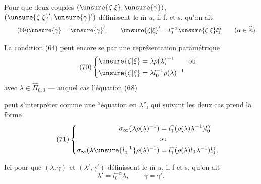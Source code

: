 Pour que deux couples $(\unsure{\zeta|\xi},\unsure{\gamma})$, $(\unsure{\zeta|\xi}',\unsure{\gamma}')$ définissent le $\overline{\mathrm m}$ $u$, il f. et s. qu'on ait
\[
\tag{69}
\unsure{\gamma}=\unsure{\gamma}',\qquad
\unsure{\zeta|\xi}'=l_0^{-\alpha}\unsure{\zeta|\xi} l_1^\alpha\qquad(\alpha\in\widehat{\mathbb Z}).
\]

La condition (64) peut encore se  par une représentation paramétrique
\[
\tag{70}
\left\{
\begin{aligned}
\unsure{\zeta|\xi}&=\lambda\rho(\lambda)^{-1}\qquad\text{ou}\\
\unsure{\zeta|\xi}&=\lambda l_0^{-1}\rho(\lambda)^{-1}
\end{aligned}
\right.
\]
avec $\lambda\in\widehat{\Pi}_{0,3}$ --- auquel cas l'équation (68)


peut s'interpréter comme une ``équation en $\lambda$'', qui suivant les deux cas prend la forme
\[
\tag{71}
\left\{
\begin{aligned}
\sigma_\infty(\lambda\rho(\lambda)^{-1})
 &=l_1^\gamma(\rho(\lambda)\lambda^{-1})l_0^\gamma\\
&\text{ou}\\
\sigma_\infty(\lambda\unsure{l_0^{-1}}\rho(\lambda)^{-1})
 &=l_1^\gamma(\rho(\lambda)l_0\lambda^{-1})l_0^\gamma,
\end{aligned}
\right.
\]

Ici pour que $(\lambda,\gamma)$ et $(\lambda',\gamma')$ définissent le $\overline{\mathrm m}$ $u$, il f et s. qu'on ait 
\[
\tag{72}
\lambda'=l_0^{-\alpha}\lambda,\qquad\gamma=\gamma'.
\]

